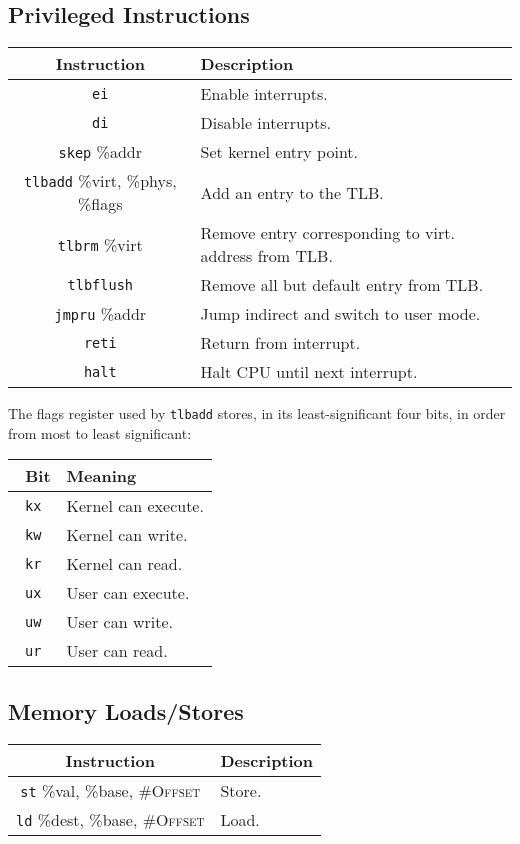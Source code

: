 \documentclass[10pt,letterpaper]{article}
\begin{document}
\subsection{Privileged Instructions}
\begin{center}
\begin{tabular}{cl}
\textbf{Instruction}&\textbf{Description}\\
\hline
\texttt{ei}      &Enable interrupts.\\
\texttt{di}      &Disable interrupts.\\
\texttt{skep} \%addr&Set kernel entry point.\\
\texttt{tlbadd} \%virt, \%phys, \%flags&Add an entry to the TLB.\\
\texttt{tlbrm} \%virt&Remove entry corresponding to virt. address from TLB.\\
\texttt{tlbflush}&Remove all but default entry from TLB.\\
\texttt{jmpru} \%addr&Jump indirect and switch to user mode.\\
\texttt{reti}&Return from interrupt.\\
\texttt{halt}&Halt CPU until next interrupt.\\
\end{tabular}
\end{center}

The flags register used by \texttt{tlbadd} stores, in its least-significant four bits, in order from most to least significant:
\begin{center}
\begin{tabular}{cl}\
\textbf{Bit}&\textbf{Meaning}\\
\hline
  \texttt{kx}&Kernel can execute.\\
  \texttt{kw}&Kernel can write.\\
  \texttt{kr}&Kernel can read.\\
  \texttt{ux}&User can execute.\\
  \texttt{uw}&User can write.\\
  \texttt{ur}&User can read.\\
\end{tabular}
\end{center}

\subsection{Memory Loads/Stores}
\begin{center}
\begin{tabular}{cl}
\textbf{Instruction}&\textbf{Description}\\
\hline
\texttt{st} \%val, \%base, \textsc{\#Offset}&Store.\\
\texttt{ld} \%dest, \%base, \textsc{\#Offset}&Load.\\
\end{tabular}
\end{center}
\end{document}
